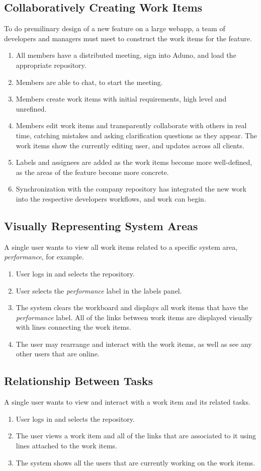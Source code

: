 \documentclass[conference]{IEEEtran}
\begin{document}
\subsection{Collaboratively Creating Work Items}
To do premilinary design of a new feature on a large webapp, a team of developers and managers must meet to construct the work items for the feature.  
\begin{enumerate}
	\item All members have a distributed meeting, sign into Aduno, and load the appropriate repository.
	\item Members are able to chat, to start the meeting.  
	\item Members create work items with initial requirements, high level and unrefined.
	\item Members edit work items and transparently collaborate with others in real time, catching mistakes and asking clarification questions as they appear.  The work items show the currently editing user, and updates across all clients. 
	\item Labels and assignees are added as the work items become more well-defined, as the areas of the feature become more concrete.
	\item Synchronization with the company repository has integrated the new work into the respective developers workflows, and work can begin.
\end{enumerate}

\subsection{Visually Representing System Areas}
A single user wants to view all work items related to a specific system area, \textit{performance}, for example. 
\begin{enumerate}
	\item User logs in and selects the repository.
	\item User selects the \textit{performance} label in the labels panel.
	\item The system clears the workboard and displays all work items that have the \textit{performance} label.  All of the links between work items are displayed visually with lines connecting the work items.
	\item The user may rearrange and interact with the work items, as well as see any other users that are online.
\end{enumerate}

\subsection{Relationship Between Tasks}
A single user wants to view and interact with a work item and its related tasks. 
\begin{enumerate}
	\item User logs in and selects the repository.
	\item The user views a work item and all of the links that are associated to it using lines attached to the work items.
	\item The system shows all the users that are currently working on the work items.
\end{enumerate}
\end{document}
